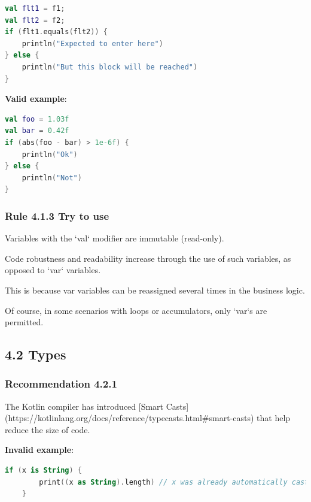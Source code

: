 {{{{\begin{lstlisting}[language=Kotlin]
val flt1 = f1;
val flt2 = f2;
if (flt1.equals(flt2)) {
    println("Expected to enter here")
} else {
    println("But this block will be reached")
} 
\end{lstlisting}


\textbf{Valid example}:



\begin{lstlisting}[language=Kotlin]
val foo = 1.03f
val bar = 0.42f
if (abs(foo - bar) > 1e-6f) {
    println("Ok")
} else {
    println("Not")
}
\end{lstlisting}


\subsubsection*{\textbf{Rule 4.1.3 Try to use}}
\leavevmode\newline



Variables with the `val` modifier are immutable (read-only).

Code robustness and readability increase through the use of such variables, as opposed to `var` variables.

This is because var variables can be reassigned several times in the business logic.

Of course, in some scenarios with loops or accumulators, only `var`s are permitted.



\subsection*{\textbf{4.2 Types}}

\subsubsection*{\textbf{Recommendation 4.2.1}}
\leavevmode\newline



The Kotlin compiler has introduced [Smart Casts](https://kotlinlang.org/docs/reference/typecasts.html\#smart-casts) that help reduce the size of code.



\textbf{Invalid example}:

\begin{lstlisting}[language=Kotlin]
    if (x is String) {
        print((x as String).length) // x was already automatically cast to String - no need to use 'as' keyword here
    }
\end{lstlisting}


}}}}
